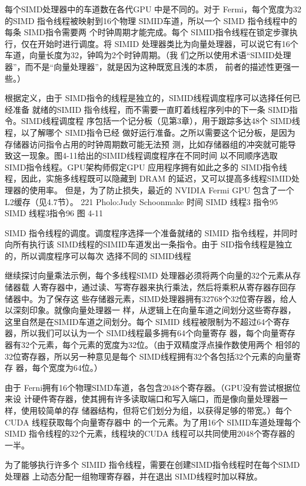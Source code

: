 每个SIMD处理器中的车道数在各代GPU 中是不同的。对于 Fermi，每个宽度为32的SIMD
指令线程被映射到16个物理 SIMID车道，所以一个 SIMD 指令线程中的每条 SIMD指令需要两
个时钟周期才能完成。每个 SIMID指令线程在锁定步骤执行，仅在开始时进行调度。将 SIMID
处理器类比为向量处理器，可以说它有16个车道，向量长度为32，钟鸣为2个时钟周期。（我
们之所以使用术语“SIMID处理器”，而不是“向量处理器”，就是因为这种既宽且浅的本质，
前者的描述性更强一些。）

根据定义，由于 SIMD指令的线程是独立的，SIMID线程调度程序可以选择任何已经准备
就绪的SIMID 指令线程，而不需要一直盯着线程序列中的下一条 SIMD指令。SIMD线程调度程
序包括一个记分板（见第3章），用于跟踪多达48个 SIMD线程，以了解哪个 SIMD指令已经
做好运行准备。之所以需要这个记分板，是因为存储器访问指令占用的时钟周期数可能无法预
测，比如存储器组的冲突就可能导致这一现象。图4-11给出的SIMID线程调度程序在不同时间
以不同顺序选取 SIMD指令线程。GPU架构师假定GPU 应用程序拥有如此之多的 SIMD指令线
程，因此，实施多线程既可以隐藏到 DRAM 的延迟，又可以提高多线程SIMID处理器的使用率。
但是，为了防止损失，最近的 NVIDIA Fermi GPU 包含了一个L2缓存（见4.7节）。
221
Pholo:Judy Schoonmake
时间
SIMD 线程3 指令95
SIMD 线程3指令96
图 4-11

SIMD 指令线程的调度。调度程序选择一个准备就绪的 SIMID 指令线程，并同时向所有执行该
SIMD线程的SIMID车道发出一条指令。由于 SID指令线程是独立的，所以调度程序可以每次
选择不同的 SIMID线程

继续探讨向量乘法示例，每个多线程SIMD 处理器必须将两个向量的32个元素从存储器载
人寄存器中，通过读、写寄存器来执行乘法，然后将乘积从寄存器存回存储器中。为了保存这
些存储器元素，SIMD处理器拥有32768个32位寄存器，给人以深刻印象。就像向量处理器一
样，从逻辑上在向量车道之间划分这些寄存器，这里自然是在SIMID车道之间划分。每个 SIMID
线程被限制为不超过64个寄存器，所以我们可以认为一个 SIMD线程最多拥有64个向量寄存
器，每个向量寄存器有32个元素，每个元素的宽度为32位。（由于双精度浮点操作数使用两个
相邻的32位寄存器，所以另一种意见是每个 SIMD线程拥有32个各包括32个元素的向量寄存
器，每个宽度为64位。）

由于 Ferni拥有16个物理SIMD车道，各包含2048个寄存器。（GPU没有尝试根据位来设
计硬件寄存器，使其拥有许多读取端口和写入端口，而是像向量处理器一样，使用较简单的存
储器结构，但将它们划分为组，以获得足够的带宽。）每个 CUDA 线程获取每个向量寄存器中
的一个元素。为了用16个 SIMID车道处理每个 SIMD 指令线程的32个元素，线程块的CUDA
线程可以共同使用2048个寄存器的一半。

为了能够执行许多个 SIMID 指令线程，需要在创建SIMD指令线程时在每个SIMD处理器
上动态分配一组物理寄存器，并在退出 SIMD线程时加以释放。

